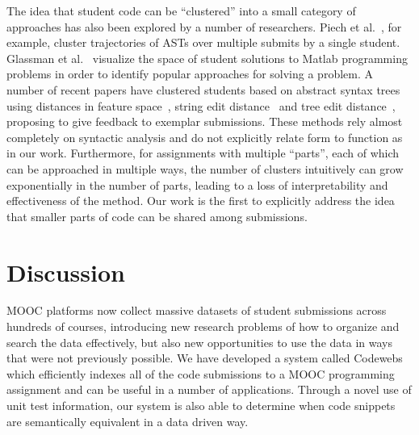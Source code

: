 The idea that student code can be ``clustered'' into a small category of approaches has also been explored by a number of researchers.
Piech et al.~\cite{piech12}, for example, cluster trajectories of ASTs over multiple submits by a single student.  
Glassman et al.~\cite{glassman13} visualize the space of student solutions to Matlab programming problems in order to identify popular approaches for
solving a problem.
A number of recent papers have clustered students based on abstract syntax trees using distances in feature 
space~\cite{gross12,gross13}, string edit distance~\cite{rivers12,rivers13}
and tree edit distance~\cite{huang13}, proposing to give feedback to exemplar submissions.	
These methods rely almost completely on syntactic analysis and do not 
explicitly relate form to function as in our work. Furthermore, for assignments with multiple ``parts'', each of which can be approached in multiple ways, 
the number of clusters intuitively can grow exponentially in the number of parts, leading to a loss of interpretability and effectiveness of the method.
Our work is the first to explicitly address the idea that smaller parts of code can be shared among submissions.

\section{Discussion}\label{sec:discussion}
MOOC platforms now collect massive datasets of student submissions across hundreds of courses, 
introducing new research problems of how to organize and search the data 
effectively, but also new opportunities to use the data in ways that were not previously possible.
We have developed a system called Codewebs which efficiently indexes all of the code submissions to a 
MOOC programming assignment and can be useful in a number of applications.  
Through a novel use of unit test information, our system is also able to determine 
when code snippets are semantically equivalent in a data driven way.

